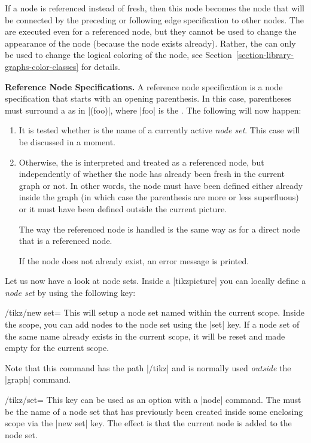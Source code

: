 If a node is referenced instead of fresh, then this node becomes the
node that will be connected by the preceding or following edge
specification to other 
nodes. The  are executed even for a referenced node, but
they cannot be used to change the appearance of the node (because the
node exists already). Rather, the  can only be used to
change the logical coloring of the node, see
Section~\ref{section-library-graphs-color-classes} for details.


\medskip
\textbf{Reference Node Specifications.} A reference node specification
is a node specification that starts with an opening parenthesis. In
this case, parentheses must surround a  as in |(foo)|,
where |foo| is the . The following will now happen:

\begin{enumerate}
\item It is tested whether  is the name of a currently
  active \emph{node set}. This case will be discussed in a moment.
\item Otherwise, the  is interpreted and treated as a
  referenced node, but independently of whether the node has already
  been fresh in the current graph or not. In other words, the node
  must have been defined either already inside the graph (in which
  case the parenthesis are more or less superfluous) or it must have
  been defined outside the current picture.

  The way the referenced node is handled is the same way as for a
  direct node that is a referenced node.

  If the node does not already exist, an error message is printed.
\end{enumerate}

Let us now have a look at node sets. Inside a |{tikzpicture}| you can
locally define a \emph{node set} by using the following key:
\begin{key}{/tikz/new set=}
  This will setup a node set named  within the current
  scope. Inside the scope, you can add nodes to the node set using the
  |set| key. If a node set of the same name already exists in the
  current scope, it will be reset and made empty for the current
  scope.

  Note that this command has the path |/tikz| and is normally used
  \emph{outside} the |graph| command.
\end{key}
\begin{key}{/tikz/set=}
  This key can be used as an option with a |node| command. The
   must be the name of a node set that has previously
  been created inside some enclosing scope via the |new set| key. The
  effect is that the current node is added to the node set.
\end{key}

